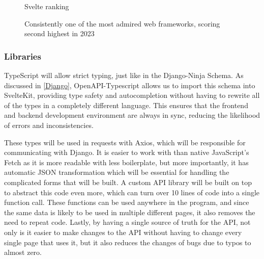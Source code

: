 \begin{figure}[h]
\centering
{}
\caption{Svelte ranking}
\vspace{-10pt}
\caption*{Consistently one of the most admired web frameworks, scoring second highest in 2023}
\vspace{-10pt}
\caption*{\parencite{noauthor_stack_nodate}}
\label{fig:svelte}
\vspace{-5pt}
\end{figure}

\subsubsection{Libraries}
TypeScript will allow strict typing, just like in the Django-Ninja Schema. As discussed in \ref{Django}, OpenAPI-Typescript allows us to import this schema into SvelteKit, providing type safety and autocompletion without having to rewrite all of the types in a completely different language. This ensures that the frontend and backend development environment are always in sync, reducing the likelihood of errors and inconsistencies. 

These types will be used in requests with Axios, which will be responsible for communicating with Django. It is easier to work with than native JavaScript's Fetch as it is more readable with less boilerplate, but more importantly, it has automatic JSON transformation which will be essential for handling the complicated forms that will be built. A custom API library will be built on top to abstract this code even more, which can turn over 10 lines of code into a single function call. These functions can be used anywhere in the program, and since the same data is likely to be used in multiple different pages, it also removes the need to repeat code. Lastly, by having a single source of truth for the API, not only is it easier to make changes to the API without having to change every single page that uses it, but it also reduces the changes of bugs due to typos to almost zero.

